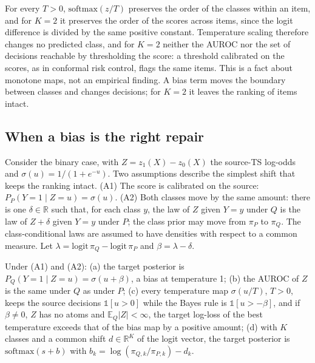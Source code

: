 For every $T > 0$, $\mathrm{softmax}(z/T)$ preserves the order of the classes within an item, and for $K = 2$ it
preserves the order of the scores across items, since the logit difference is divided by the same positive constant.
Temperature scaling therefore changes no predicted class, and for $K = 2$ neither the AUROC nor the set of decisions
reachable by thresholding the score: a threshold calibrated on the scores, as in conformal risk control, flags the
same items. This is a fact about monotone maps, not an empirical finding. A bias term moves the boundary between
classes and changes decisions; for $K = 2$ it leaves the ranking of items intact.

\subsection{When a bias is the right repair}
\label{sec:background-location}

Consider the binary case, with $Z = z_1(X) - z_0(X)$ the source-TS log-odds and $\sigma(u) = 1/(1 + e^{-u})$. Two
assumptions describe the simplest shift that keeps the ranking intact. (A1) The score is calibrated on the source:
$P_P(Y = 1 \mid Z = u) = \sigma(u)$. (A2) Both classes move by the same amount: there is one $\delta \in \mathbb{R}$
such that, for each class $y$, the law of $Z$ given $Y = y$ under $Q$ is the law of $Z + \delta$ given $Y = y$ under
$P$; the class prior may move from $\pi_P$ to $\pi_Q$. The class-conditional laws are assumed to have densities
with respect to a common measure. Let $\lambda = \mathrm{logit}\, \pi_Q - \mathrm{logit}\, \pi_P$
and $\beta = \lambda - \delta$.

\begin{proposition}
\label{prop:location}
Under (A1) and (A2): (a) the target posterior is $P_Q(Y = 1 \mid Z = u) = \sigma(u + \beta)$, a bias at temperature 1;
(b) the AUROC of $Z$ is the same under $Q$ as under $P$; (c) every temperature map $\sigma(u/T)$, $T > 0$, keeps the
source decisions $\mathbb{1}[u > 0]$ while the Bayes rule is $\mathbb{1}[u > -\beta]$, and if $\beta \ne 0$, $Z$ has
no atoms and $\mathbb{E}_Q|Z| < \infty$, the target log-loss of the best temperature exceeds that of the bias map by a
positive amount; (d) with $K$ classes and a common shift $d \in \mathbb{R}^K$ of the logit vector, the target posterior
is $\mathrm{softmax}(s + b)$ with $b_k = \log(\pi_{Q,k}/\pi_{P,k}) - d_k$.
\end{proposition}

